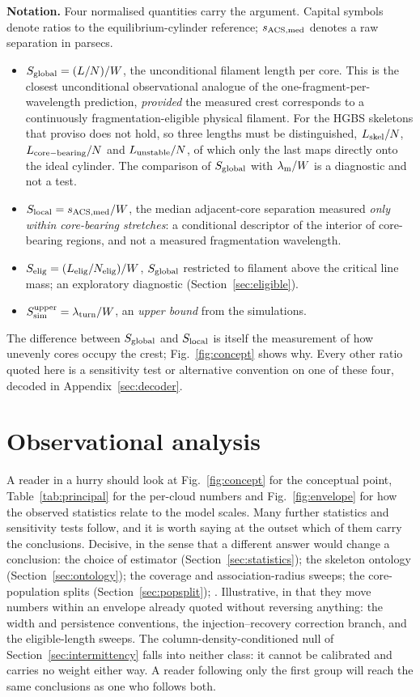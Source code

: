 \documentclass[usenatbib,twoside,twocolumn]{mnras}
\begin{document}
\label{sec:intro_notation}
\noindent\textbf{Notation.} Four normalised quantities carry the argument. Capital symbols denote ratios to the equilibrium-cylinder reference; $s_{\rm ACS,med}$ denotes a raw separation in parsecs.
\begin{itemize}\setlength{\itemsep}{1pt}
\item $S_{\rm global}=(L/N)/W$, the unconditional filament length per core. This is the closest unconditional observational analogue of the one-fragment-per-wavelength prediction, \emph{provided} the measured crest corresponds to a continuously fragmentation-eligible physical filament. For the HGBS skeletons that proviso does not hold, so three lengths must be distinguished, $L_{\rm skel}/N$, $L_{\rm core-bearing}/N$ and $L_{\rm unstable}/N$, of which only the last maps directly onto the ideal cylinder. The comparison of $S_{\rm global}$ with $\lambda_{\rm m}/W$ is a diagnostic and not a test.
\item $S_{\rm local}=s_{\rm ACS,med}/W$, the median adjacent-core separation measured \emph{only within core-bearing stretches}: a conditional descriptor of the interior of core-bearing regions, and not a measured fragmentation wavelength.
\item $S_{\rm elig}=(L_{\rm elig}/N_{\rm elig})/W$, $S_{\rm global}$ restricted to filament above the critical line mass; an exploratory diagnostic (Section~\ref{sec:eligible}).
\item $S_{\rm sim}^{\rm upper}=\lambda_{\rm turn}/W$, an \emph{upper bound} from the simulations.
\end{itemize}
The difference between $S_{\rm global}$ and $S_{\rm local}$ is itself the measurement of how unevenly cores occupy the crest; Fig.~\ref{fig:concept} shows why. Every other ratio quoted here is a sensitivity test or alternative convention on one of these four, decoded in Appendix~\ref{sec:decoder}.

\section{Observational analysis}

\noindent A reader in a hurry should look at Fig.~\ref{fig:concept} for the conceptual point, Table~\ref{tab:principal} for the per-cloud numbers and Fig.~\ref{fig:envelope} for how the observed statistics relate to the model scales. Many further statistics and sensitivity tests follow, and it is worth saying at the outset which of them carry the conclusions. Decisive, in the sense that a different answer would change a conclusion: the choice of estimator (Section~\ref{sec:statistics}); the skeleton ontology (Section~\ref{sec:ontology}); the coverage and association-radius sweeps; the core-population splits (Section~\ref{sec:popsplit}); . Illustrative, in that they move numbers within an envelope already quoted without reversing anything: the width and persistence conventions, the injection--recovery correction branch, and the eligible-length sweeps. The column-density-conditioned null of Section~\ref{sec:intermittency} falls into neither class: it cannot be calibrated and carries no weight either way. A reader following only the first group will reach the same conclusions as one who follows both.
\end{document}
